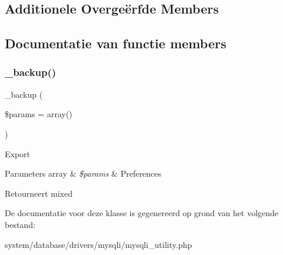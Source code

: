 \subsection*{Additionele Overge\"{e}rfde Members}


\subsection{Documentatie van functie members}
\mbox{\label{class_c_i___d_b__mysqli__utility_a30f3053d2c82e7562349924363507afa}} 
\subsubsection{\texorpdfstring{\_backup()}{\_backup()}}
{\footnotesize\ttfamily \+\_\+backup (\begin{DoxyParamCaption}\item[{}]{\$params = {\ttfamily array()} }\end{DoxyParamCaption})\hspace{0.3cm}{\ttfamily [protected]}}

Export


\begin{DoxyParams}[1]{Parameters}
array & {\em \$params} & Preferences \\
\hline
\end{DoxyParams}
\begin{DoxyReturn}{Retourneert}
mixed 
\end{DoxyReturn}


De documentatie voor deze klasse is gegenereerd op grond van het volgende bestand\+:\begin{DoxyCompactItemize}
\item 
system/database/drivers/mysqli/mysqli\+\_\+utility.\+php\end{DoxyCompactItemize}
